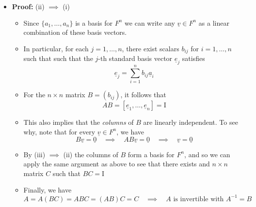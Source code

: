 \documentclass[11pt,twoside]{report}
\newcommand{\vecnot}{\underline}
\newcommand{\Id}{{\mathrm{I}}}
\newcommand{\Span}{\mathrm{span}}
\begin{document}
\begin{itemize}
\begin{itemize}

\end{itemize}



\item \textbf{Proof:} (ii) $\implies$ (i)
\begin{itemize}
\item  Since $\{a_1, \dots, a_n\}$ is a basis for $F^n$ we can write any $\vecnot{v} \in F^n$ as a linear combination of these basis vectors. 

\item  In particular, for  each $j = 1, \dots, n$, there exist scalars $b_{ij}$ for $i = 1, \dots , n$ such that 
  such that the $j$-th standard basis vector $\vecnot{e}_j$ satisfies
\[
\vecnot{e}_j = \sum_{i=1}^n b_{ij} \vecnot{a}_i
\]

\item For the $n \times n$ matrix $B = (b_{ij})$, it follows that
\[
A B  = [ \vecnot{e}_1, \dots, \vecnot{e}_n] = \Id
\]

\item 
This also implies that the \emph{columns} of $B$ are linearly independent. To see why, note that  for every $\vecnot{v} \in F^n$, we have
\[
B \vecnot{v} = \vecnot{0}  \quad \implies \quad  A B\vecnot{v} =  \vecnot{0}  \quad \implies \quad \vecnot{v} =  \vecnot{0} 
\]

\item By (iii) $\implies$ (ii) the columns of $B$ form a basis for $F^n$, and so we can apply the same argument as above to see that there exists and $n \times n$ matrix $C$ such that $B C = \Id$

\item Finally, we have
\[
A = A (BC) = A B C  = (AB) C  = C  \quad \implies \quad \text{$A$ is invertible with $A^{-1} = B $}
\]


%
\end{itemize}


\end{itemize}
\end{document}
